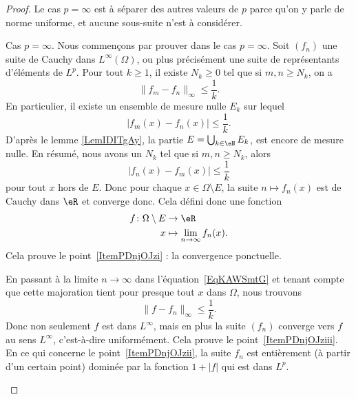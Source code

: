 \begin{proof}
    Le cas \( p=\infty\) est à séparer des autres valeurs de \( p\) parce qu'on y parle de norme uniforme, et aucune sous-suite n'est à considérer.
    \begin{subproof}
    \item[Cas \( p=\infty\).]
    Nous commençons par prouver dans le cas \( p=\infty\). Soit \( (f_n)\) une suite de Cauchy dans \( L^{\infty}(\Omega)\), ou plus précisément une suite de représentants d'éléments de \( L^p\). Pour tout \( k\geq 1\), il existe \( N_k\geq 0\) tel que si \( m,n\geq N_k\), on a
    \begin{equation}
        \| f_m-f_n \|_{\infty}\leq \frac{1}{ k }.
    \end{equation}
    En particulier, il existe un ensemble de mesure nulle \( E_k\) sur lequel
    \begin{equation}
        | f_m(x)-f_n(x) |\leq\frac{1}{ k }.
    \end{equation}
    D'après le lemme \ref{LemIDITgAy}, la partie \( E=\bigcup_{k\in \eN}E_k\), est encore de mesure nulle. En  résumé, nous avons un \( N_k\) tel que si \( m,n\geq N_k\), alors
    \begin{equation}    \label{EqKAWSmtG}
        | f_n(x)-f_m(x) |\leq \frac{1}{ k }
    \end{equation}
    pour tout \( x\) hors de \( E\). Donc pour chaque \( x\in\Omega\setminus E\), la suite \( n\mapsto f_n(x)\) est de Cauchy dans \( \eR\) et converge donc. Cela défini donc une fonction
    \begin{equation}
        \begin{aligned}
            f\colon \Omega\setminus E&\to \eR \\
            x&\mapsto \lim_{n\to \infty} f_n(x).
        \end{aligned}
    \end{equation}
    Cela prouve le point~\ref{ItemPDnjOJzi} : la convergence ponctuelle.

    En passant à la limite \( n\to \infty\) dans l'équation~\ref{EqKAWSmtG} et tenant compte que cette majoration tient pour presque tout \( x\) dans \( \Omega\), nous trouvons
    \begin{equation}
        \| f-f_n \|_{\infty}\leq \frac{1}{ k }.
    \end{equation}
    Donc non seulement \( f\) est dans \( L^{\infty}\), mais en plus la suite \( (f_n)\) converge vers \( f\) au sens \( L^{\infty}\), c'est-à-dire uniformément. Cela prouve le point~\ref{ItemPDnjOJziii}. En ce qui concerne le point~\ref{ItemPDnjOJzii}, la suite \( f_n\) est entièrement (à partir d'un certain point) dominée par la fonction \( 1+| f |\) qui est dans \( L^p\).


\end{subproof}
\end{proof}
